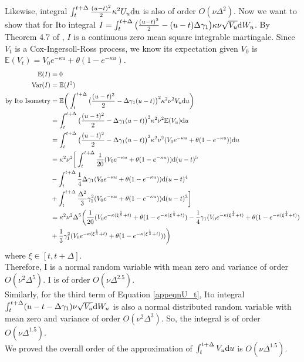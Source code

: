 \documentclass{ws-ijfe}
\begin{document}
Likewise, integral $ \int_{t}^{t+\Delta}\frac{(u-t)^2}{2}\kappa^2U_u\mathrm{d} u$ is also of order $O(\nu\Delta^2)$.
Now we want to show that for Ito integral $I =\int_{t}^{t+\Delta}\big(\frac{(u-t)^2}{2}-(u-t)\Delta\gamma_1\big)\kappa\nu\sqrt{V_u}\mathrm{d} W_u$. By Theorem 4.7 of \cite{Klebaner2005}, $I$ is a continuous zero mean square integrable martingale.  Since $V_t$ is a Cox-Ingersoll-Ross process, we know its expectation given $V_0$ is $\mathbb{E}(V_t)=V_0 e^{-\kappa u}+\theta(1-e^{-\kappa u})$.
\begin{align*}
 \mathbb{E}(I)&= 0\\
  \text{Var}(I)&= \mathbb{E}(I^2) \\
  \text{by Ito Isometry} &= \mathbb{E}\bigg(\int_{t}^{t+\Delta}\big(\frac{(u-t)^2}{2}-\Delta\gamma_1(u-t)\big)^2\kappa^2\nu^2 V_u\mathrm{d} u\bigg)\\
  &=\int_{t}^{t+\Delta}\big(\frac{(u-t)^2}{2}-\Delta\gamma_1(u-t)\big)^2\kappa^2\nu^2 \mathbb{E}(V_u)\mathrm{d} u\\
  &=\int_{t}^{t+\Delta}\big(\frac{(u-t)^2}{2}-\Delta\gamma_1(u-t)\big)^2\kappa^2\nu^2 (V_0 e^{-\kappa u}+\theta(1-e^{-\kappa u}))\mathrm{d} u\\
  &=\kappa^2\nu^2\bigg[\int_{t}^{t+\Delta}\frac{1}{20} (V_0 e^{-\kappa u}+\theta(1-e^{-\kappa u})) \mathrm{d} (u-t)^5\\
  &-\int_{t}^{t+\Delta}\frac{1}{4}\Delta\gamma_1 (V_0 e^{-\kappa u}+\theta(1-e^{-\kappa u}))\mathrm{d} (u-t)^4\\
  &+\int_{t}^{t+\Delta}\frac{\Delta^2}{3}\gamma_1^2(V_0 e^{-\kappa u}+\theta(1-e^{-\kappa u})) \mathrm{d}(u-t)^3\bigg]\\
  &=\kappa^2\nu^2 \Delta^5\bigg(\frac{1}{20}(V_0 e^{-\kappa (\xi^\frac{1}{5}+t)}+\theta(1-e^{-\kappa (\xi^\frac{1}{5}+t)})-\frac{1}{4}\gamma_1(V_0 e^{-\kappa (\xi^\frac{1}{4}+t)}+\theta(1-e^{-\kappa (\xi^\frac{1}{4}+t)})\\
  &+\frac{1}{3}\gamma_1^2(V_0 e^{-\kappa (\xi^\frac{1}{3}+t)}+\theta(1-e^{-\kappa(\xi^\frac{1}{3}+t)}))\bigg)
\end{align*}
where $\xi\in[t,t+\Delta]$.\\
Therefore, I is a normal random variable with mean zero and variance of order $O(\nu^2\Delta^5)$. I is of order $O(\nu\Delta^{2.5})$.\\
Similarly, for the third term of Equation \ref{appeqnU_t}, Ito integral $\int_{t}^{t+\Delta}(u-t-\Delta\gamma_1)\nu\sqrt{V_u}\mathrm{d} W_u$ is also a normal distributed random variable with mean zero and variance of order $O(\nu^2\Delta^{3})$. So, the integral is of order $O(\nu\Delta^{1.5})$.\\
We proved the overall order of the approximation of $\int_{t}^{t+\Delta}V_u\mathrm{d} u $ is $O(\nu\Delta^{1.5})$.
\end{document}
